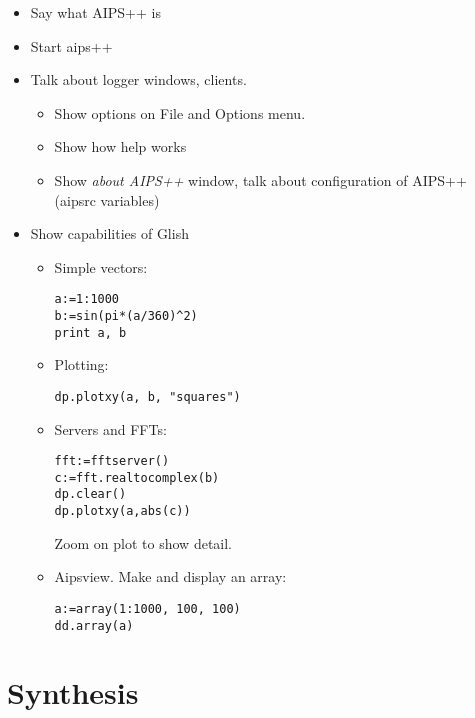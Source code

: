 \begin{itemize}
\item Say what AIPS++ is
\item Start aips++
\item Talk about logger windows, clients. 
\begin{itemize}
\item Show options on File and Options menu. 
\item Show how help works
\item Show {\em about AIPS++} window, talk about configuration of
AIPS++ (aipsrc variables)
\end{itemize}
\item Show capabilities of Glish
\begin{itemize}
\item Simple vectors: 
\begin{verbatim}
a:=1:1000
b:=sin(pi*(a/360)^2)
print a, b
\end{verbatim}
\item Plotting: 
\begin{verbatim}
dp.plotxy(a, b, "squares")
\end{verbatim}
\item Servers and FFTs:
\begin{verbatim}
fft:=fftserver()
c:=fft.realtocomplex(b)
dp.clear()
dp.plotxy(a,abs(c))
\end{verbatim}
Zoom on plot to show detail.
\item Aipsview. Make and display an array:
\begin{verbatim}
a:=array(1:1000, 100, 100)
dd.array(a)
\end{verbatim}
\end{itemize}
\end{itemize}

\section{Synthesis}


